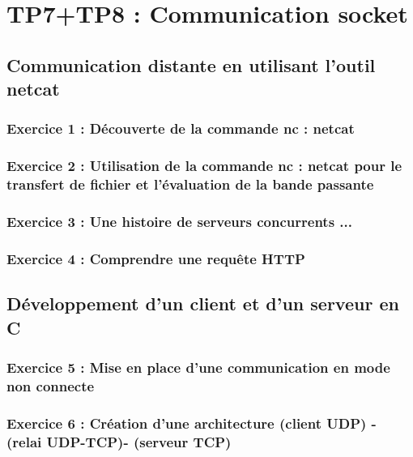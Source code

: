 \chapter{TP7+TP8 : Communication socket}

\section{Communication distante en utilisant l’outil netcat}

\subsection{Exercice 1 : Découverte de la commande nc : netcat}

\subsection{Exercice 2 : Utilisation de la commande nc : netcat pour le transfert de fichier et l’évaluation de
la bande passante}

\subsection{Exercice 3 : Une histoire de serveurs concurrents ...}

\subsection{Exercice 4 : Comprendre une requête HTTP}

\section{Développement d’un client et d’un serveur en C}

\subsection{Exercice 5 : Mise en place d’une communication en mode non connecte}

\subsection{Exercice 6 : Création d’une architecture (client UDP) - (relai UDP-TCP)- (serveur TCP)}

\inputminted[linenos,firstline=65, lastline=98]{cpp}{../sources/cpp/TP7-8/serveurTCP.c}

